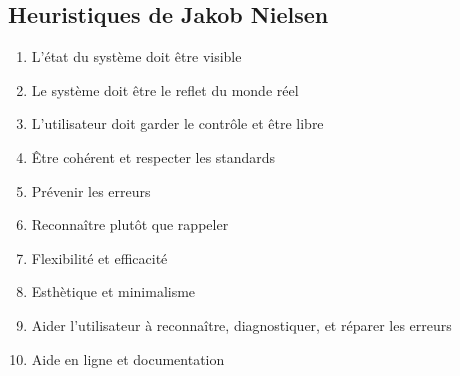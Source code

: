 \documentclass[10pt]{article}
\begin{document}
\subsection{Heuristiques de Jakob Nielsen}

\begin{enumerate}
\item{L'état du système doit être visible}
\item{Le système doit être le reflet du monde réel}
\item{L'utilisateur doit garder le contrôle et être libre}
\item{Être cohérent et respecter les standards}
\item{Prévenir les erreurs}
\item{Reconnaître plutôt que rappeler}
\item{Flexibilité et efficacité}
\item{Esthètique et minimalisme}
\item{Aider l'utilisateur à reconnaître, diagnostiquer, et réparer les erreurs}
\item{Aide en ligne et documentation}
\end{enumerate}
\end{document}
